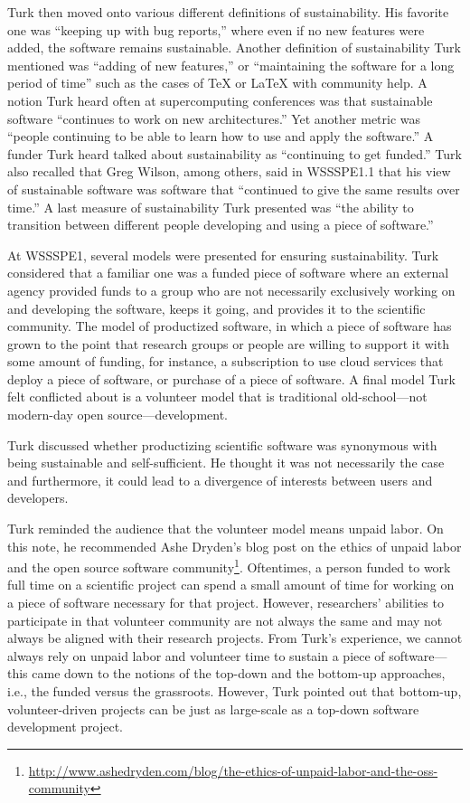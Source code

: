 \documentclass[11pt, oneside]{amsart}
\begin{document}
Turk then moved onto various different definitions of sustainability. His
favorite one was ``keeping up with bug reports,'' where even if no new features
were added, the software remains sustainable. Another definition of
sustainability Turk mentioned was ``adding of new features,'' or ``maintaining the
software for a long period of time'' such as the cases of TeX or LaTeX with
community help. A notion Turk heard often at supercomputing conferences was that
sustainable software ``continues to work on new architectures.'' Yet another
metric was ``people continuing to be able to learn how to use and apply the
software.'' A funder Turk heard talked about sustainability as ``continuing to get
funded.'' Turk also recalled that Greg Wilson, among others, said in WSSSPE1.1
that his view of sustainable software was software that ``continued to give the
same results over time.'' A last measure of sustainability Turk presented was
``the ability to transition between different people developing and using a piece
of software.''

At WSSSPE1, several models were presented for ensuring sustainability. Turk
considered that a familiar one was a funded piece of software where an external
agency provided funds to a group who are not necessarily exclusively working on
and developing the software, keeps it going, and provides it to the scientific
community. The model of productized software, in which a piece of software has
grown to the point that research groups or people are willing to support it with
some amount of funding, for instance, a subscription to use cloud services that
deploy a piece of software, or purchase of a piece of software. A final model
Turk felt conflicted about is a volunteer model that is traditional
old-school---not modern-day open source---development.

Turk discussed whether productizing scientific software was synonymous with
being sustainable and self-sufficient. He thought it was not necessarily the
case and furthermore, it could lead to a divergence of interests between users
and developers.

Turk reminded the audience that the volunteer model means unpaid labor. On this
note, he recommended Ashe Dryden's blog post on the ethics of unpaid labor and
the open source software
community\footnote{\url{http://www.ashedryden.com/blog/the-ethics-of-unpaid-labor-and-the-oss-community}}.
Oftentimes, a person funded to work full time on a scientific project can spend
a small amount of time for working on a piece of software necessary for that
project. However, researchers' abilities to participate in that volunteer
community are not always the same and may not always be aligned with their
research projects. From Turk's experience, we cannot always rely on unpaid labor
and volunteer time to sustain a piece of software---this came down to the
notions of the top-down and the bottom-up approaches, i.e., the funded versus
the grassroots. However, Turk pointed out that bottom-up, volunteer-driven
projects can be just as large-scale as a top-down software development project.
\end{document}
